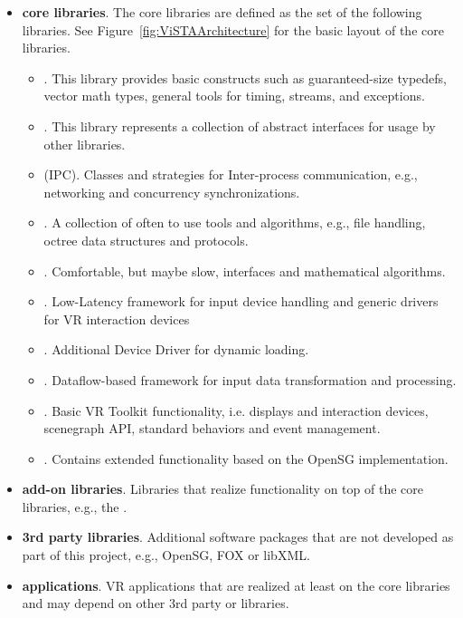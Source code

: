 \begin{itemize}

\item \textbf{ core libraries}. The  core libraries are defined as the set of the following libraries. See Figure~\ref{fig:ViSTAArchitecture} for the basic layout of the  core libraries.
  \begin{itemize}
  \item {}. 
    This library provides basic constructs such as guaranteed-size typedefs, vector math types, general tools for timing, streams, and exceptions.
  \item {}. 
    This library represents a collection of abstract interfaces for usage by other libraries.
  \item {} (IPC).
  	Classes and strategies for Inter-process communication, e.g., networking and concurrency synchronizations.
  \item {}.
  	A collection of often to use tools and algorithms, e.g., file handling, octree data structures and protocols.
  \item {}.
  	Comfortable, but maybe slow, interfaces and mathematical algorithms.
  \item {}.
  	Low-Latency framework for input device handling and generic drivers for VR interaction devices
  \item {}.
    Additional Device Driver for dynamic loading.
  \item {}.
  	Dataflow-based framework for input data transformation and processing.
  \item {}.
  	Basic VR Toolkit functionality, i.e. displays and interaction devices, scenegraph API, standard behaviors and event management.
  \item {}.
  	Contains extended functionality based on the OpenSG implementation.
  \end{itemize}

\item \textbf{ add-on libraries}.
  Libraries that realize functionality on top of the  core libraries, e.g., the .

\item \textbf{3rd party libraries}.
  Additional software packages that are not developed as part of this project, e.g., OpenSG, FOX or libXML.

\item \textbf{ applications}.
  VR applications that are realized at least on the  core libraries and may depend on other 3rd party or  libraries.

\end{itemize}

